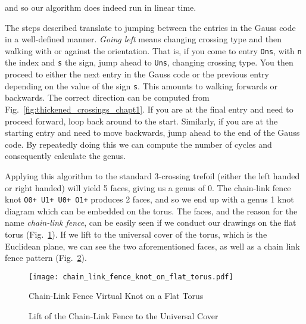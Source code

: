         and so our algorithm does indeed run in linear time.
        \par\hfill\par
        The steps described translate to jumping between the entries in the
        Gauss code in a well-defined manner. \textit{Going left} means changing
        crossing type and then walking with or against the orientation.
        That is, if you come to entry \texttt{Ons}, with \texttt{n} the index
        and \texttt{s} the sign, jump ahead to \texttt{Uns}, changing crossing
        type. You then proceed to either the next entry in the Gauss code or
        the previous entry depending on the value of the sign \texttt{s}.
        This amounts to walking forwards or backwards. The correct direction
        can be computed from Fig.~\ref{fig:thickened_crossings_chapt1}.
        If you are at the final entry and need to proceed forward,
        loop back around to the
        start. Similarly, if you are at the starting entry and need to move
        backwards, jump ahead to the end of the Gauss code. By repeatedly
        doing this we can compute the number of cycles and consequently
        calculate the genus.
        \par\hfill\par
        Applying this algorithm to the standard 3-crossing trefoil (either the
        left handed or right handed) will yield 5 faces, giving us a genus of
        0. The chain-link fence knot \texttt{O0+ U1+ U0+ O1+} produces 2 faces,
        and so we end up with a genus 1 knot diagram which can be embedded on
        the torus. The faces, and the reason for the name
        \textit{chain-link fence}, can be easily seen if we conduct our drawings
        on the flat torus (Fig.~\ref{fig:chain_link_fence_knot_on_flat_torus}).
        If we lift to the universal cover of the torus, which is the Euclidean
        plane, we can see the two aforementioned faces, as well as a chain
        link fence pattern
        (Fig.~\ref{fig:chain_link_fence_knot_on_flat_torus_universal_cover}).
        \begin{figure}
            \centering
            \texttt{[image: chain\_link\_fence\_knot\_on\_flat\_torus.pdf]}
            \caption{Chain-Link Fence Virtual Knot on a Flat Torus}
            \label{fig:chain_link_fence_knot_on_flat_torus}
        \end{figure}
        \begin{figure}
            \centering
            \caption{Lift of the Chain-Link Fence to the Universal Cover}
            \label{fig:chain_link_fence_knot_on_flat_torus_universal_cover}
        \end{figure}
